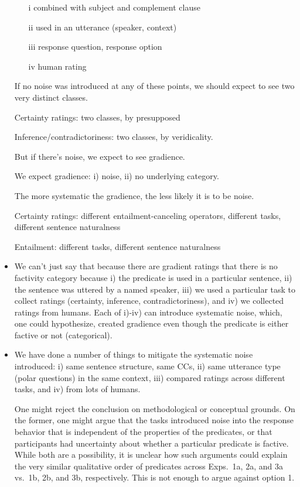 \documentclass[11pt,fleqn]{article}
\newcommand{\6}{\mbox{$[\hspace*{-.6mm}[$}}
\newcommand{\9}{\mbox{$]\hspace*{-.6mm}]$}}
\begin{document}
\begin{itemize}
\begin{enumerate}
\item[i] combined with subject and complement clause

\item[ii] used in an utterance (speaker, context)

\item[iii] response question, response option

\item[iv] human rating

\end{enumerate}

If no noise was introduced at any of these points, we should expect to see two very distinct classes. 

Certainty ratings: two classes, by presupposed

Inference/contradictoriness: two classes, by veridicality.

But if there's noise, we expect to see gradience. 

We expect gradience: i) noise, ii) no underlying category.

The more systematic the gradience, the less likely it is to be noise. 

Certainty ratings: different entailment-canceling operators, different tasks, different sentence naturalness

Entailment: different tasks, different sentence naturalness

\item We can't just say that because there are gradient ratings that there is no factivity category because i) the predicate is used in a particular sentence, ii) the sentence was uttered by a named speaker, iii) we used a particular task to collect ratings (certainty, inference, contradictoriness), and iv) we collected ratings from humans. Each of i)-iv) can introduce systematic noise, which, one could hypothesize, created gradience even though the predicate is either factive or not (categorical).

\item We have done a number of things to mitigate the systematic noise introduced: i) same sentence structure, same CCs, ii) same utterance type (polar questions) in the same context, iii) compared ratings across different tasks, and iv) from lots of humans.

One might reject the conclusion on methodological or conceptual grounds. On the former, one might argue that the tasks introduced noise into the response behavior that is independent of the properties of the predicates, or that participants had uncertainty about whether a particular predicate is factive. While both are a possibility,  it is unclear how such arguments could explain the very similar qualitative order of predicates across  Exps.~1a, 2a, and 3a vs.~1b, 2b, and 3b, respectively. This is not enough to argue against option 1.


\end{itemize}
\end{document}
